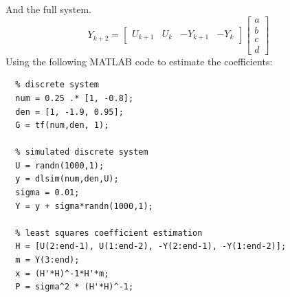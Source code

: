 \documentclass[11pt]{article}
\begin{document}
\begin{enumerate}[label=\textbf{\arabic*.}]
\begin{equation*}
  \end{equation*}
  And the full system.
  \begin{equation*}
    Y_{k+2} = 
    \begin{bmatrix}
      U_{k+1} & U_{k} & -Y_{k+1} & -Y_{k}
    \end{bmatrix}
    \begin{bmatrix}
      a \\ b \\ c \\ d
    \end{bmatrix}
  \end{equation*}
  Using the following MATLAB code to estimate the coefficients:
  \begin{lstlisting}
  % discrete system
  num = 0.25 .* [1, -0.8]; 
  den = [1, -1.9, 0.95];
  G = tf(num,den, 1);
  
  % simulated discrete system
  U = randn(1000,1);
  y = dlsim(num,den,U); 
  sigma = 0.01;
  Y = y + sigma*randn(1000,1); 
  
  % least squares coefficient estimation
  H = [U(2:end-1), U(1:end-2), -Y(2:end-1), -Y(1:end-2)];
  m = Y(3:end);
  x = (H'*H)^-1*H'*m;
  P = sigma^2 * (H'*H)^-1;
  

\end{lstlisting}
\end{enumerate}
\end{document}
